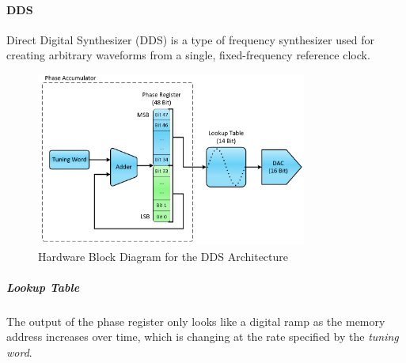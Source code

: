 \paragraph{DDS} Direct Digital Synthesizer (DDS) is a type of frequency synthesizer used for creating arbitrary waveforms from a single, fixed-frequency reference clock.

\begin{figure}
  \centering
  \includegraphics[width=3.5in]{fig/Fig_2_DDS_Block_Diagram.png}
  \caption{Hardware Block Diagram for the DDS Architecture}\label{fig_DDS}
\end{figure}

\subparagraph{Lookup Table}

The output of the phase register only looks like a digital ramp as the memory address increases over time, which is changing at the rate specified by the \emph{tuning word}. 